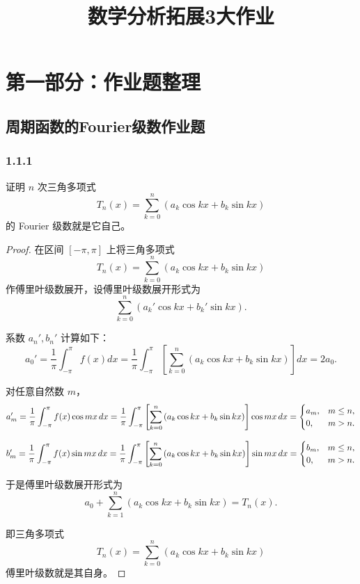 \documentclass[12pt]{ctexart}
\begin{document}
\title{数学分析拓展3大作业} %
\newpage
\tableofcontents %
\newpage



\section{第一部分：作业题整理} %

\setcounter{section}{1} %
\setcounter{subsection}{0} %
\subsection{周期函数的Fourier级数作业题} 
\subsubsection*{1.1.1}
\noindent 证明 $n$ 次三角多项式
\[
T_n(x) = \sum_{k=0}^n \left( a_k \cos kx + b_k \sin kx \right)
\]
的 Fourier 级数就是它自己。

\begin{proof}
在区间 $[-\pi, \pi]$ 上将三角多项式
\[
T_n(x) = \sum_{k=0}^n \left(a_k \cos kx + b_k \sin kx \right)
\]
作傅里叶级数展开，设傅里叶级数展开形式为
\[
\sum_{k=0}^n \left(a_k' \cos kx + b_k' \sin kx \right).
\]

系数 $a_n', b_n'$ 计算如下：
\[
a_0' = \frac{1}{\pi} \int_{-\pi}^\pi f(x) dx = \frac{1}{\pi} \int_{-\pi}^\pi \left[\sum_{k=0}^n \left(a_k \cos kx + b_k \sin kx \right) \right] dx = 2a_0.
\]

对任意自然数 $m$，
\[
a_m' = \frac{1}{\pi} \int_{-\pi}^\pi f(x) \cos mx \, dx = \frac{1}{\pi} \int_{-\pi}^\pi \left[\sum_{k=0}^n \left(a_k \cos kx + b_k \sin kx \right) \right] \cos mx \, dx \\ = \begin{cases} a_m, & m \leq n, \\ 0, & m > n. \end{cases}
\]

\[
b_m' = \frac{1}{\pi} \int_{-\pi}^\pi f(x) \sin mx \, dx = \frac{1}{\pi} \int_{-\pi}^\pi \left[\sum_{k=0}^n \left(a_k \cos kx + b_k \sin kx \right) \right] \sin mx \, dx \\ = \begin{cases} b_m, & m \leq n, \\ 0, & m > n. \end{cases}
\]

于是傅里叶级数展开形式为
\[
a_0 + \sum_{k=1}^n \left(a_k \cos kx + b_k \sin kx \right) = T_n(x).
\]

即三角多项式
\[
T_n(x) = \sum_{k=0}^n \left(a_k \cos kx + b_k \sin kx \right)
\]
傅里叶级数就是其自身。
\end{proof}
\end{document}
